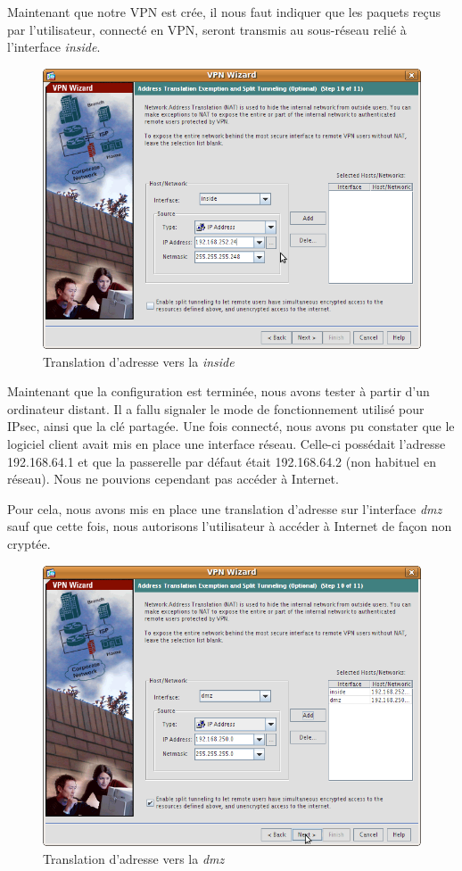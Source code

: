 \documentclass[a4paper,12pt]{article}
\begin{document}
Maintenant que notre VPN est crée, il nous faut indiquer que les paquets reçus par l'utilisateur, connecté en VPN, seront transmis au sous-réseau
relié à l'interface \textit{inside}.
\begin{figure}[H]
	\center
	\includegraphics[width=12cm]{img/vpn8.png}
	\caption{Translation d'adresse vers la \textit{inside}}
\end{figure}

Maintenant que la configuration est terminée, nous avons tester à partir d'un ordinateur distant. Il a fallu signaler le mode de fonctionnement
utilisé pour IPsec, ainsi que la clé partagée. Une fois connecté, nous avons pu constater que le logiciel client avait mis en place une interface réseau.
Celle-ci possédait l'adresse 192.168.64.1 et que la passerelle par défaut était 192.168.64.2 (non habituel en réseau). Nous ne pouvions cependant pas
accéder à Internet.

Pour cela, nous avons mis en place une translation d'adresse sur l'interface \textit{dmz} sauf que cette fois, nous autorisons l'utilisateur 
à accéder à Internet de façon non cryptée.
\begin{figure}[H]
	\center
	\includegraphics[width=12cm]{img/vpnwizard_alt.png}
	\caption{Translation d'adresse vers la \textit{dmz}}
\end{figure}
\end{document}
